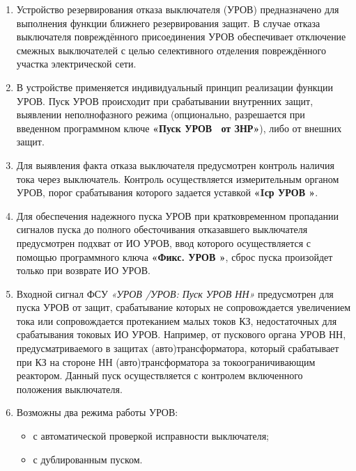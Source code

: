 \begin{enumerate}

\item
Устройство резервирования отказа выключателя (УРОВ) предназначено для выполнения функции ближнего резервирования защит. В случае отказа выключателя повреждённого присоединения УРОВ обеспечивает отключение смежных выключателей с целью селективного отделения повреждённого участка электрической сети.

\AbzazUROV

\item
В устройстве применяется индивидуальный принцип реализации функции УРОВ. Пуск УРОВ происходит при срабатывании внутренних защит, выявлении неполнофазного режима (опционально, разрешается при введенном программном ключе \textbf{«Пуск УРОВ \Q~от ЗНР»}), либо от внешних защит. 

\item
Для выявления факта отказа выключателя предусмотрен контроль наличия тока через выключатель. Контроль осуществляется измерительным органом УРОВ, порог срабатывания которого задается уставкой \textbf{«Iср УРОВ \Q»}.

\item
Для обеспечения надежного пуска УРОВ при кратковременном пропадании сигналов пуска до полного обесточивания отказавшего выключателя предусмотрен подхват от ИО УРОВ, ввод которого осуществляется с помощью программного ключа \textbf{«Фикс. УРОВ \Q»}, сброс пуска произойдет только при возврате ИО УРОВ.

\item
Входной сигнал ФСУ \textit{«УРОВ \Q/УРОВ: Пуск УРОВ НН»} предусмотрен для пуска УРОВ от защит, срабатывание которых не сопровождается увеличением тока или сопровождается протеканием малых токов КЗ, недостаточных для срабатывания токовых ИО УРОВ. Например, от пускового органа УРОВ НН, предусматриваемого в защитах (авто)трансформатора, который срабатывает при КЗ на стороне НН (авто)трансформатора за токоограничивающим реактором. Данный пуск осуществляется с контролем включенного положения выключателя.

\item
Возможны два режима работы УРОВ:
\begin{itemize}
    \item с автоматической проверкой исправности выключателя;
    \item с дублированным пуском.
\end{itemize}


\end{enumerate}
